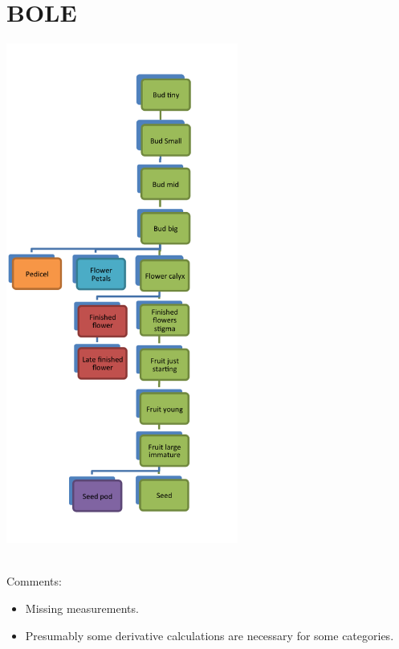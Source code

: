 \documentclass[10pt]{book} %
\begin{document}
\section{BOLE}
\begin{multicols}{2}
\includegraphics[width=3in]{BOLE.png}
\vfill
\columnbreak

\\Comments:
\begin{itemize}
\item Missing measurements.
\item Presumably some derivative calculations are necessary for some categories.
\end{itemize}
\end{multicols}


\clearpage
\newpage
\end{document}
